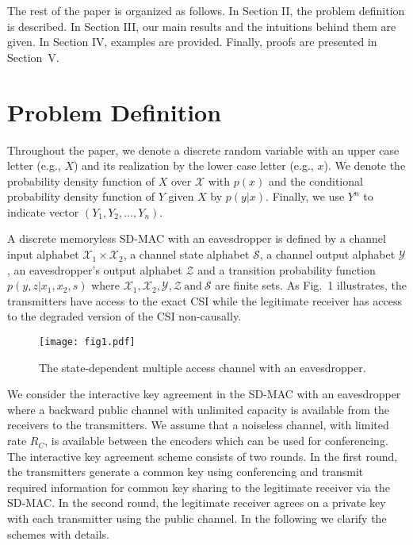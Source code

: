 \documentclass[conference,8pt]{IEEEtran}
\begin{document}
{The rest of the paper is organized as follows. In Section II, the problem definition is described. In Section III, our main results and the intuitions behind them are given. In Section IV, examples are provided. Finally, proofs are presented in Section~V. 

\section{Problem Definition}{
Throughout the paper, we denote a discrete random variable with an upper case letter (e.g., $X$) and its realization by the lower case letter (e.g., $x$). We denote the probability density function of $X$ over $\mathcal{X}$ with $p(x)$ and the conditional probability density function of $Y$ given $X$ by $p(y|x)$. Finally, we use $Y^n$ to indicate vector $(Y_{1},Y_{2}, \ldots ,Y_{n})$.

A discrete memoryless SD-MAC with an eavesdropper is defined by a channel input alphabet $\mathcal{X}_1 \times \mathcal{X}_2$, a channel state alphabet $\mathcal{S}$, a channel output alphabet $\mathcal{Y}$, an eavesdropper's output alphabet $\mathcal{Z}$ and a transition probability function $p(y,z|x_1,x_2,s)$ where $\mathcal{X}_1 , \mathcal{X}_2 , \mathcal{Y} , \mathcal{Z} \ \text{and} \ \mathcal{S}$ are finite sets. As Fig.~1 illustrates, the transmitters have access to the exact CSI while the legitimate receiver has access to the degraded version of the CSI non-causally. \\

\begin{figure}
\texttt{[image: fig1.pdf]}
\caption{The state-dependent multiple access channel with an eavesdropper.}
\end{figure}

We consider the interactive key agreement in the SD-MAC with an eavesdropper where a backward public channel with unlimited capacity is available from the receivers to the transmitters. We assume that a noiseless channel, with limited rate $R_C$, is available between the encoders which can be used for conferencing. The interactive key agreement scheme consists of two rounds. In the first round, the transmitters generate a common key using conferencing and transmit required information for common key sharing to the legitimate receiver via the SD-MAC. In the second round, the legitimate receiver agrees on a private key with each transmitter using the public channel. In the following we clarify the schemes with details.
}}
\end{document}
